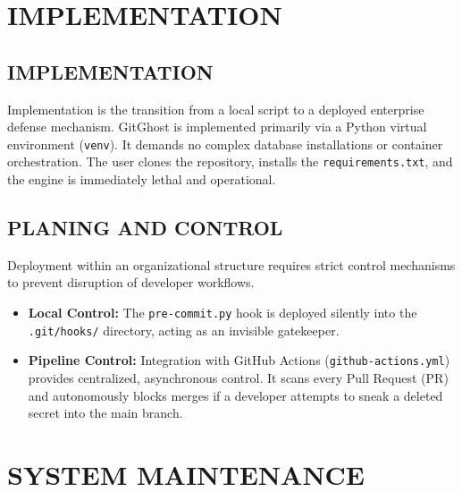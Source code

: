 \documentclass[12pt, a4paper, oneside]{report}
\begin{document}
\chapter{IMPLEMENTATION}

\section{IMPLEMENTATION}
Implementation is the transition from a local script to a deployed enterprise defense mechanism. GitGhost is implemented primarily via a Python virtual environment (\texttt{venv}). It demands no complex database installations or container orchestration. The user clones the repository, installs the \texttt{requirements.txt}, and the engine is immediately lethal and operational.

\section{PLANING AND CONTROL}
Deployment within an organizational structure requires strict control mechanisms to prevent disruption of developer workflows. 
\begin{itemize}
    \item \textbf{Local Control:} The \texttt{pre-commit.py} hook is deployed silently into the \texttt{.git/hooks/} directory, acting as an invisible gatekeeper.
    \item \textbf{Pipeline Control:} Integration with GitHub Actions (\texttt{github-actions.yml}) provides centralized, asynchronous control. It scans every Pull Request (PR) and autonomously blocks merges if a developer attempts to sneak a deleted secret into the main branch.
\end{itemize}

\chapter{SYSTEM MAINTENANCE}
\end{document}
